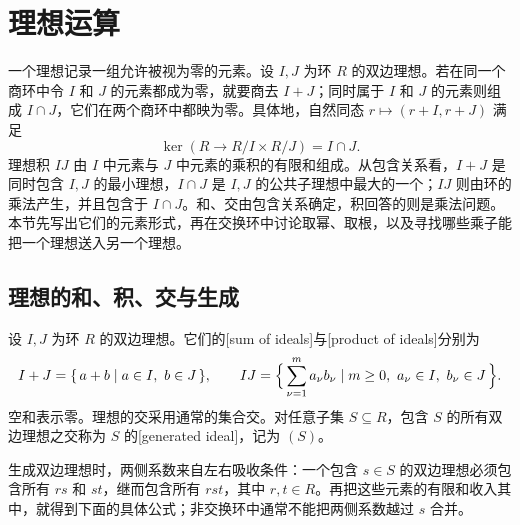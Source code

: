 
\section{理想运算}
\label{b1:sec:1003}

一个理想记录一组允许被视为零的元素。设 \(I,J\) 为环 \(R\) 的双边理想。若在同一个商环中令 \(I\) 和 \(J\) 的元素都成为零，就要商去 \(I+J\)；同时属于 \(I\) 和 \(J\) 的元素则组成 \(I\cap J\)，它们在两个商环中都映为零。具体地，自然同态 \(r\mapsto(r+I,r+J)\) 满足
\[
	\ker\!\left(R\longrightarrow R/I\times R/J\right)=I\cap J.
\]
理想积 \(IJ\) 由 \(I\) 中元素与 \(J\) 中元素的乘积的有限和组成。从包含关系看，\(I+J\) 是同时包含 \(I,J\) 的最小理想，\(I\cap J\) 是 \(I,J\) 的公共子理想中最大的一个；\(IJ\) 则由环的乘法产生，并且包含于 \(I\cap J\)。和、交由包含关系确定，积回答的则是乘法问题。本节先写出它们的元素形式，再在交换环中讨论取幂、取根，以及寻找哪些乘子能把一个理想送入另一个理想。

%
%

\subsection{理想的和、积、交与生成}
\label{b1:subsec:1003:01}
\begin{definition}\label{b1:def:ideal-operations}
	设 \(I,J\) 为环 \(R\) 的双边理想。它们的[sum of ideals]与[product of ideals]分别为
	\[
		I+J=\{\,a+b\mid a\in I,\ b\in J\,\},\qquad IJ=\Bigl\{\,\sum_{\nu=1}^m a_\nu b_\nu\mid m\geq0,\ a_\nu\in I,\ b_\nu\in J\,\Bigr\}.
	\]
	空和表示零。理想的交采用通常的集合交。对任意子集 \(S\subseteq R\)，包含 \(S\) 的所有双边理想之交称为 \(S\) 的[generated ideal]，记为 \((S)\)。
\end{definition}

生成双边理想时，两侧系数来自左右吸收条件：一个包含 \(s\in S\) 的双边理想必须包含所有 \(rs\) 和 \(st\)，继而包含所有 \(rst\)，其中 \(r,t\in R\)。再把这些元素的有限和收入其中，就得到下面的具体公式；非交换环中通常不能把两侧系数越过 \(s\) 合并。

